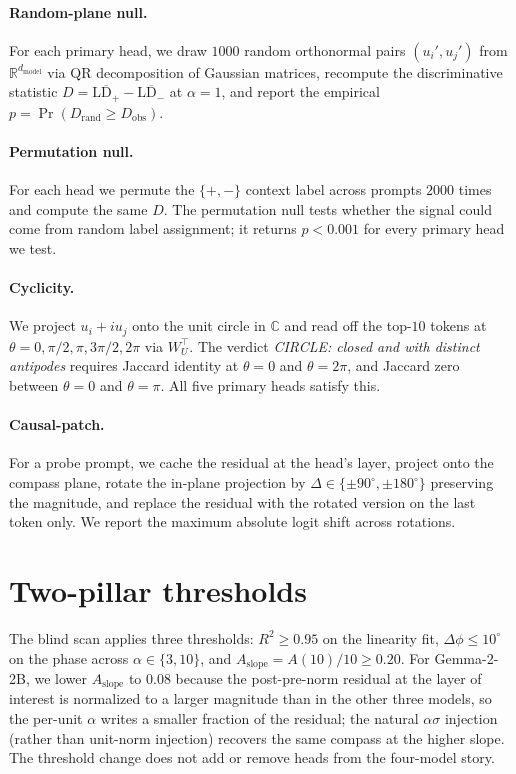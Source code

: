 \paragraph{Random-plane null.} For each primary head, we draw $1000$
random orthonormal pairs $(u_i', u_j')$ from
$\mathbb{R}^{d_{\text{model}}}$ via QR decomposition of Gaussian
matrices, recompute the discriminative statistic
$D = \overline{\mathrm{LD}_{+}} - \overline{\mathrm{LD}_{-}}$ at
$\alpha = 1$, and report the empirical $p = \Pr(D_{\text{rand}} \ge
D_{\text{obs}})$.

\paragraph{Permutation null.} For each head we permute the
$\{+,-\}$ context label across prompts $2000$ times and compute the
same $D$. The permutation null tests whether the signal could come
from random label assignment; it returns $p < 0.001$ for every primary
head we test.

\paragraph{Cyclicity.} We project $u_i + i u_j$ onto the unit circle
in $\mathbb{C}$ and read off the top-$10$ tokens at $\theta =
0, \pi/2, \pi, 3\pi/2, 2\pi$ via $W_U^\top$. The verdict
\emph{CIRCLE: closed and with distinct antipodes} requires Jaccard
identity at $\theta = 0$ and $\theta = 2\pi$, and Jaccard zero
between $\theta = 0$ and $\theta = \pi$. All five primary heads
satisfy this.

\paragraph{Causal-patch.} For a probe prompt, we cache the residual
at the head's layer, project onto the compass plane, rotate the
in-plane projection by $\Delta \in \{\pm 90^\circ, \pm 180^\circ\}$
preserving the magnitude, and replace the residual with the rotated
version on the last token only. We report the maximum absolute
logit shift across rotations.

\section{Two-pillar thresholds}
\label{app:thresholds}

The blind scan applies three thresholds: $R^2 \ge 0.95$ on the
linearity fit, $\Delta\phi \le 10^\circ$ on the phase across
$\alpha \in \{3, 10\}$, and $A_{\text{slope}} = A(10)/10 \ge 0.20$.
For Gemma-2-2B, we lower $A_{\text{slope}}$ to $0.08$ because the
post-pre-norm residual at the layer of interest is normalized to a
larger magnitude than in the other three models, so the per-unit
$\alpha$ writes a smaller fraction of the residual; the natural
$\alpha\sigma$ injection (rather than unit-norm injection) recovers
the same compass at the higher slope. The threshold change does not
add or remove heads from the four-model story.


